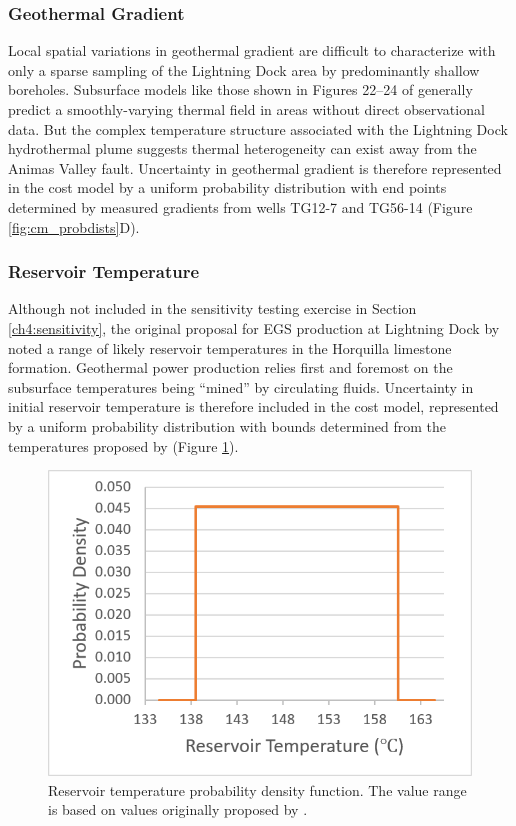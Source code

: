 \subsubsection{Geothermal Gradient}\label{cm4:prob_gradient}

Local spatial variations in geothermal gradient are difficult to characterize with only a sparse sampling of the Lightning Dock area by predominantly shallow boreholes. Subsurface models like those shown in Figures 22--24 of \citep{cunniff_final_2005} generally predict a smoothly-varying thermal field in areas without direct observational data. But the complex temperature structure associated with the Lightning Dock hydrothermal plume suggests thermal heterogeneity can exist away from the Animas Valley fault. Uncertainty in geothermal gradient is therefore represented in the cost model by a uniform probability distribution with end points determined by measured gradients from wells TG12-7 and TG56-14 (Figure \ref{fig:cm_probdists}D).

\subsubsection{Reservoir Temperature}\label{cm4:prob_temp}

Although not included in the sensitivity testing exercise in Section \ref{ch4:sensitivity}, the original proposal for EGS production at Lightning Dock by \citet{schochet_development_2001} noted a range of likely reservoir temperatures in the Horquilla limestone formation. Geothermal power production relies first and foremost on the subsurface temperatures being ``mined'' by circulating fluids. Uncertainty in initial reservoir temperature is therefore included in the cost model, represented by a uniform probability distribution with bounds determined from the temperatures proposed by \citet{schochet_development_2001} (Figure \ref{fig:cm_temp_pdf}).

\begin{figure}[H]
\centering
\includegraphics[scale=0.45]{templates/images/Figure-Reservoir_Temp_PDF.png}
\singlespacing
\caption[Reservoir temperature PDF]{Reservoir temperature probability density function. The value range is based on values originally proposed by \protect\citet{schochet_development_2001}.}
\label{fig:cm_temp_pdf}
\end{figure}

